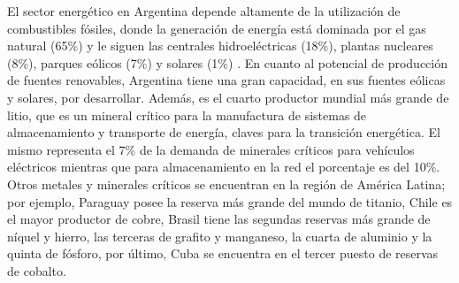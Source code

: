 El sector energético en Argentina depende altamente de la utilización de 
combustibles fósiles, donde la generación de energía está dominada por el gas 
natural (65\%) y le siguen las centrales hidroeléctricas (18\%), plantas nucleares
(8\%), parques eólicos (7\%) y solares (1\%) \cite{IEA}. En cuanto al potencial de 
producción de fuentes renovables, Argentina tiene una gran capacidad, en sus 
fuentes eólicas y solares, por desarrollar. Además, es el cuarto productor mundial más 
grande de litio, que es un mineral crítico para la manufactura de sistemas de 
almacenamiento y transporte de energía, claves para la transición energética. 
El mismo representa el 7\% de la demanda de minerales críticos para vehículos eléctricos mientras que 
para almacenamiento en la red el porcentaje es del 10\%. Otros metales y 
minerales críticos se encuentran en la región de América Latina; por ejemplo, 
Paraguay posee la reserva más grande del mundo de titanio, Chile es el mayor 
productor de cobre, Brasil tiene las segundas reservas más grande de níquel y
hierro, las terceras de grafito y manganeso, la cuarta de aluminio y la quinta de 
fósforo, por último, Cuba se encuentra en el tercer puesto de reservas de cobalto.

